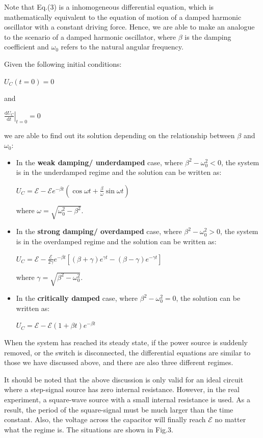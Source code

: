 \documentclass[a4paper,12pt]{article}
\begin{document}
Note that Eq.(3) is a inhomogeneous differential equation, which is mathematically equivalent to the equation of motion of a damped harmonic oscillator with a constant driving force. Hence, we are able to make an analogue to the scenario of a damped harmonic oscillator, where $\beta$ is the damping coefficient and $\omega_0$ refers to the natural angular frequency. 
\par Given the following initial conditions:
\begin{center}
$\displaystyle U_{C}(t=0)=0$ 
\end{center}
and 
\begin{center}
$\displaystyle \left.\frac{\mathrm{d} U_{C}}{\mathrm{d} t}\right|_{t=0}=0$ 
\end{center}
we are able to find out its solution depending on the relationship between $\beta$ and $\omega_0$:
\begin{itemize}
\item In the \textbf{weak damping/ underdamped} case, where $\beta^{2}-\omega_{0}^{2}<0$, the system is in the underdamped regime and the solution can be written as:
	\begin{center}
	$U_{C}=\mathcal{E}-\mathcal{E} e^{-\beta t}\left(\cos \omega t+\frac{\beta}{\omega} \sin \omega t\right)$
	\end{center}
	where $\omega=\sqrt{\omega_{0}^{2}-\beta^{2}}$.
\item In the \textbf{strong damping/ overdamped} case, where $\beta^{2}-\omega_{0}^{2}>0$, the system is in the overdamped regime and the solution can be written as:
	\begin{center}
	$U_{C}=\mathcal{E}-\frac{\mathcal{E}}{2 \gamma} e^{-\beta t}\left[(\beta+\gamma) e^{\gamma t}-(\beta-\gamma) e^{-\gamma t}\right]$
	\end{center}
	where $\gamma=\sqrt{\beta^{2}-\omega_{0}^{2}}$.
\item In the \textbf{critically damped} case, where $\beta^{2}-\omega_{0}^{2}=0$, the solution can be written as:
	\begin{center}
	$U_{C}=\mathcal{E}-\mathcal{E}(1+\beta t) e^{-\beta t}$
	\end{center}
\end{itemize}
When the system has reached its steady state, if the power source is suddenly removed, or the switch is disconnected, the differential equations are similar to those we have discussed above, and there are also three different regimes. 
\par It should be noted that the above discussion is only valid for an ideal circuit where a step-signal source has zero internal resistance. However, in the real experiment, a square-wave source with a small internal resistance is used. As a result, the period of the square-signal must be much larger than the time constant. Also, the voltage across the capacitor will finally reach $\mathcal{E}$ no matter what the regime is. The situations are shown in Fig.3.
\end{document}
